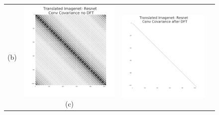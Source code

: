\documentclass{article} %
\begin{document}
\begin{figure}[ht]
\begin{tabular}{cccc}
    \hspace{-\imgwidth}
        (b)
    \hspace{\imgwidth}\hspace{-\lwidth}
&
\hspace*{-0.8cm} \includegraphics[width=\imgwidth]{figures_nips/trans_imagenet_cov.pdf}
    \hspace{-\imgwidth}
        (c)
    \hspace{\imgwidth}\hspace{-\lwidth}
&
 \hspace*{-0.8cm} \includegraphics[width=\imgwidth]{figures_nips/trans_imagenet_fourier.pdf}

\end{tabular}
\end{figure}
\end{document}
